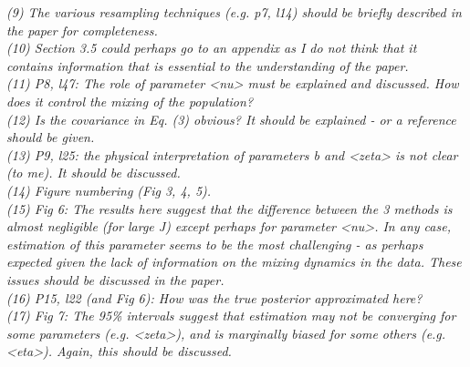\documentclass{article}
\begin{document}
\noindent \emph{(9) The various resampling techniques (e.g. p7, l14) should be briefly described in the paper for completeness.} \\

\noindent \emph{(10) Section 3.5 could perhaps go to an appendix as I do not think that it contains information that is essential to the understanding of the paper.} \\

\noindent \emph{(11) P8, l47: The role of parameter <nu> must be explained and discussed. How does it control the mixing of the population?} \\

\noindent \emph{(12) Is the covariance in Eq. (3) obvious? It should be explained - or a reference should be given.} \\

\noindent \emph{(13) P9, l25: the physical interpretation of parameters b and <zeta> is not clear (to me). It should be discussed.} \\

\noindent \emph{(14) Figure numbering (Fig 3, 4, 5).} \\

\noindent \emph{(15) Fig 6: The results here suggest that the difference between the 3 methods is almost negligible (for large J) except perhaps for parameter <nu>. In any case, estimation of this parameter seems to be the most challenging - as perhaps expected given the lack of information on the mixing dynamics in the data. These issues should be discussed in the paper.} \\

\noindent \emph{(16) P15, l22 (and Fig 6): How was the true posterior approximated here?} \\

\noindent \emph{(17) Fig 7: The 95\% intervals suggest that estimation may not be converging for some parameters (e.g. <zeta>), and is marginally biased for some others (e.g. <eta>). Again, this should be discussed.} \\
\end{document}
